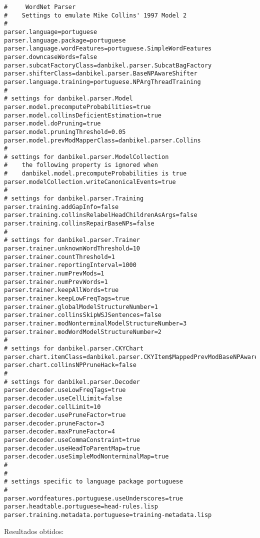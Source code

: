 \scriptsize
\begin{verbatim}
#     WordNet Parser
#    Settings to emulate Mike Collins' 1997 Model 2
#
parser.language=portuguese
parser.language.package=portuguese
parser.language.wordFeatures=portuguese.SimpleWordFeatures
parser.downcaseWords=false
parser.subcatFactoryClass=danbikel.parser.SubcatBagFactory
parser.shifterClass=danbikel.parser.BaseNPAwareShifter
parser.language.training=portuguese.NPArgThreadTraining
#
# settings for danbikel.parser.Model
parser.model.precomputeProbabilities=true
parser.model.collinsDeficientEstimation=true
parser.model.doPruning=true
parser.model.pruningThreshold=0.05
parser.model.prevModMapperClass=danbikel.parser.Collins
#
# settings for danbikel.parser.ModelCollection
#    the following property is ignored when
#    danbikel.model.precomputeProbabilities is true
parser.modelCollection.writeCanonicalEvents=true
#
# settings for danbikel.parser.Training
parser.training.addGapInfo=false
parser.training.collinsRelabelHeadChildrenAsArgs=false
parser.training.collinsRepairBaseNPs=false
#
# settings for danbikel.parser.Trainer
parser.trainer.unknownWordThreshold=10
parser.trainer.countThreshold=1
parser.trainer.reportingInterval=1000
parser.trainer.numPrevMods=1
parser.trainer.numPrevWords=1
parser.trainer.keepAllWords=true
parser.trainer.keepLowFreqTags=true
parser.trainer.globalModelStructureNumber=1
parser.trainer.collinsSkipWSJSentences=false
parser.trainer.modNonterminalModelStructureNumber=3
parser.trainer.modWordModelStructureNumber=2
#
# settings for danbikel.parser.CKYChart
parser.chart.itemClass=danbikel.parser.CKYItem$MappedPrevModBaseNPAware
parser.chart.collinsNPPruneHack=false
#
# settings for danbikel.parser.Decoder
parser.decoder.useLowFreqTags=true
parser.decoder.useCellLimit=false
parser.decoder.cellLimit=10
parser.decoder.usePruneFactor=true
parser.decoder.pruneFactor=3
parser.decoder.maxPruneFactor=4
parser.decoder.useCommaConstraint=true
parser.decoder.useHeadToParentMap=true
parser.decoder.useSimpleModNonterminalMap=true
#
#
# settings specific to language package portuguese
#
parser.wordfeatures.portuguese.useUnderscores=true
parser.headtable.portuguese=head-rules.lisp
parser.training.metadata.portuguese=training-metadata.lisp
\end{verbatim}

\normalsize

Resultados obtidos:

